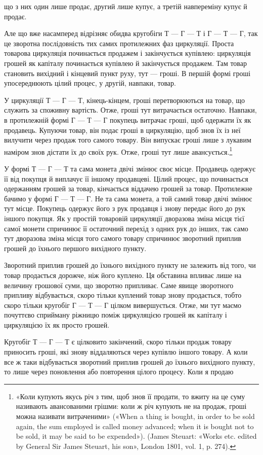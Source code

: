\parcont{}  %
що з них один лише продає, другий лише купує, а третій навпереміну
купує й продає.

Але що вже насамперед відрізняє обидва кругобіги Т — Г — Т
і Г — Т — Г, так це зворотна послідовність тих самих протилежних
фаз циркуляції. Проста товарова циркуляція починається
продажем і закінчується купівлею: циркуляція грошей як капіталу
починається купівлею й закінчується продажем. Там
товар становить вихідний і кінцевий пункт руху, тут — гроші.
В першій формі гроші упосереднюють цілий процес, у другій,
навпаки, товар.

У циркуляції Т — Г — Т, кінець-кінцем, гроші перетворюються
на товар, що служить за споживну вартість. Отже, гроші
тут витрачається остаточно. Навпаки, в протилежній формі
Г — Т — Г покупець витрачає гроші, щоб одержати їх як продавець.
Купуючи товар, він подає гроші в циркуляцію, щоб
знов їх із неї вилучити через продаж того самого товару. Він
випускає гроші лише з лукавим наміром знов дістати їх до своїх
рук. Отже, гроші тут лише авансується.\footnote{
«Коли купують якусь річ з тим, щоб знов її продати, то вжиту
на це суму називають авансованими грішми: коли ж річ купують не
на продаж, гроші можна називати витраченими» («When a thing is bought,
in order to be sold again, the sum employed is called money advanced;
when it is bought not to be sold, it may be said to be expended»). (James
Steuart: «Works etc. edited by General Sir James Steuart, his son», London
1801, vol. 1, p. 274).
}

У формі Т — Г — Т та сама монета двічі змінює своє місце.
Продавець одержує її від покупця й виплачує її іншому продавцеві.
Цілий процес, що починається одержанням грошей за товар,
кінчається віддачею грошей за товар. Протилежне бачимо у
формі Г — Т — Г. Не та сама монета, а той самий товар двічі
змінює тут місце. Покупець одержує його з рук продавця і знову
передає його до рук іншого покупця. Як у простій товаровій
циркуляції дворазова зміна місця тієї самої монети спричинює
її остаточний перехід з одних рук до інших, так само тут дворазова
зміна місця того самого товару спричинює зворотний приплив
грошей до їхнього першого вихідного пункту.

Зворотний приплив грошей до їхнього вихідного пункту не
залежить від того, чи товар продається дорожче, ніж його куплено.
Ця обставина впливає лише на величину грошової суми, що зворотно
припливає. Саме явище зворотного припливу відбувається,
скоро тільки куплений товар знову продається, тобто скоро
тільки кругобіг Г — Т — Г цілком вивершується. Отже, ми тут
маємо почуттєво сприйману ріжницю поміж циркуляцією грошей
як капіталу і циркуляцією їх як просто грошей.

Кругобіг Т — Г — Т є цілковито закінчений, скоро тільки
продаж товару приносить гроші, які знову віддаляються через
купівлю іншого товару. А коли все ж таки відбувається зворотний
приплив грошей до їхнього вихідного пункту, то лише через
поновлення або повторення цілого процесу. Коли я продаю
\parbreak{}  %
